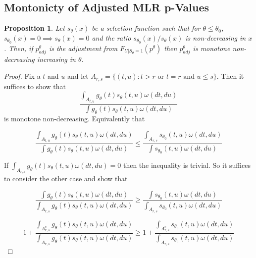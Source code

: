 \documentclass{article}
\newtheorem{proposition}{Proposition}
\begin{document}
\begin{appendix}
\subsection{Montonicty of Adjusted MLR p-Values}

\begin{proposition}
    \label{prop:monotone_adjustment}
    Let $s_{\theta}(x)$ be a selection function such that for $\theta \leq \theta_0$, $s_{\theta_0}(x)= 0 \implies s_{\theta}(x) = 0$ and the ratio $s_{\theta_0}(x)/s_{\theta}(x)$ is non-decreasing in $x$. Then, if $p^{\theta}_{adj}$ is the adjustment from $F_{U | S_{\theta} = 1}(p^{\theta})$ then $p^{\theta}_{adj}$ is monotone non-decreasing increasing in $\theta$.  

\end{proposition}



\begin{proof}

        Fix a $t$ and $u$ and let $A_{r, s} = \{(t, u) : t > r \text{ or } t = r \text{ and } u \leq s \}$. Then it suffices to show that 
        \begin{equation*}
            \frac{ \int_{A_{t, u}}  g_{\theta}(t) s_{\theta}(t, u) \omega(dt, du)}{ \int g_{\theta}(t) s_{\theta}(t, u) \omega(dt, du)}
        \end{equation*}
        is monotone non-decreasing. Equivalently that  

        \begin{equation*}
            \frac{ \int_{A_{t, u}}  g_{\theta}(t) s_{\theta}(t, u) \omega(dt, du)}{ \int g_{\theta}(t) s_{\theta}(t, u) \omega(dt, du)} \leq \frac{ \int_{A_{r, s}} s_{\theta_0}(t, u) \omega(dt, du)}{ \int s_{\theta_0}(t, u) \omega(dt, du)}
        \end{equation*}

        If $\int_{A_{r, s}}  g_{\theta}(t) s_{\theta}(t, u) \omega(dt, du) = 0$ then the inequality is trivial. So it suffices to consider the other case and show that 

        \begin{equation*}
            \frac{ \int g_{\theta}(t) s_{\theta}(t, u) \omega(dt, du)} { \int_{A_{r, s}}  g_{\theta}(t) s_{\theta}(t, u) \omega(dt, du)} \geq \frac{ \int s_{\theta_0}(t, u) \omega(dt, du)}{ \int_{A_{r, s}} s_{\theta_0}(t, u) \omega(dt, du)}
        \end{equation*}

        \begin{equation*}
            1 + \frac{ \int_{A_{r, s}^c} g_{\theta}(t) s_{\theta}(t, u) \omega(dt, du)} { \int_{A_{r, s}}  g_{\theta}(t) s_{\theta}(t, u) \omega(dt, du)}\geq 1 + \frac{ \int_{A_{r, s}^c} s_{\theta_0}(t, u) \omega(dt, du)}{ \int_{A_{r, s}} s_{\theta_0}(t, u) \omega(dt, du)}
        \end{equation*}


\end{proof}
\end{appendix}
\end{document}
